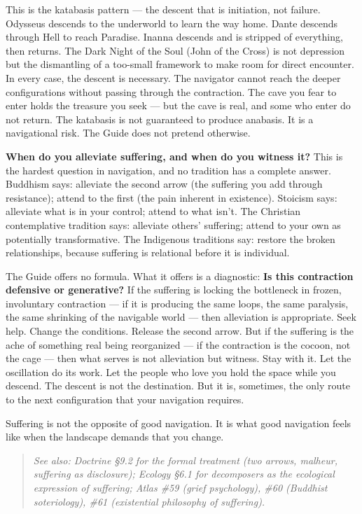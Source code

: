 This is the katabasis pattern — the descent that is initiation, not failure. Odysseus descends to the underworld to learn the way home. Dante descends through Hell to reach Paradise. Inanna descends and is stripped of everything, then returns. The Dark Night of the Soul (John of the Cross) is not depression but the dismantling of a too-small framework to make room for direct encounter. In every case, the descent is necessary. The navigator cannot reach the deeper configurations without passing through the contraction. The cave you fear to enter holds the treasure you seek — but the cave is real, and some who enter do not return. The katabasis is not guaranteed to produce anabasis. It is a navigational risk. The Guide does not pretend otherwise.


\textbf{When do you alleviate suffering, and when do you witness it?} This is the hardest question in navigation, and no tradition has a complete answer. Buddhism says: alleviate the second arrow (the suffering you add through resistance); attend to the first (the pain inherent in existence). Stoicism says: alleviate what is in your control; attend to what isn't. The Christian contemplative tradition says: alleviate others' suffering; attend to your own as potentially transformative. The Indigenous traditions say: restore the broken relationships, because suffering is relational before it is individual.


The Guide offers no formula. What it offers is a diagnostic: \textbf{Is this contraction defensive or generative?} If the suffering is locking the bottleneck in frozen, involuntary contraction — if it is producing the same loops, the same paralysis, the same shrinking of the navigable world — then alleviation is appropriate. Seek help. Change the conditions. Release the second arrow. But if the suffering is the ache of something real being reorganized — if the contraction is the cocoon, not the cage — then what serves is not alleviation but witness. Stay with it. Let the oscillation do its work. Let the people who love you hold the space while you descend. The descent is not the destination. But it is, sometimes, the only route to the next configuration that your navigation requires.


Suffering is not the opposite of good navigation. It is what good navigation feels like when the landscape demands that you change.


\begin{quote}
\itshape
\textit{See also: Doctrine §9.2 for the formal treatment (two arrows, malheur, suffering as disclosure); Ecology §6.1 for decomposers as the ecological expression of suffering; Atlas \#59 (grief psychology), \#60 (Buddhist soteriology), \#61 (existential philosophy of suffering).}
\end{quote}


\bigskip\noindent\makebox[\textwidth]{\color{rulegray}\rule{5cm}{0.3pt}}\bigskip

